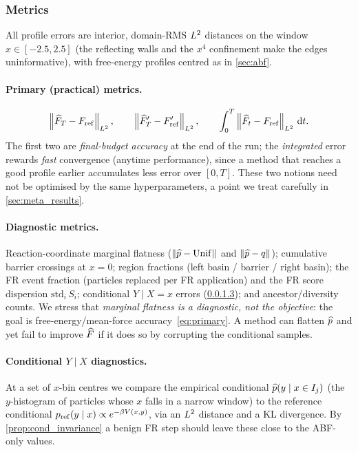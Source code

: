 \subsubsection{Metrics}
\label{sec:metrics}
All profile errors are interior, domain-RMS $L^2$ distances on the window
$x\in[-2.5,2.5]$ (the reflecting walls and the $x^4$ confinement make the edges
uninformative), with free-energy profiles centred as in \cref{sec:abf}.

\paragraph{Primary (practical) metrics.}
\begin{equation}
  \left\lVert \widehat{F}_T-F_{\mathrm{ref}} \right\rVert_{L^2},\qquad
  \left\lVert \widehat{F}'_T-F'_{\mathrm{ref}} \right\rVert_{L^2},\qquad
  \int_0^T \left\lVert \widehat{F}_t-F_{\mathrm{ref}} \right\rVert_{L^2}\,\mathrm{d} t.
  \label{eq:primary}
\end{equation}
The first two are \emph{final-budget accuracy} at the end of the run; the
\emph{integrated} error rewards \emph{fast} convergence (anytime performance),
since a method that reaches a good profile earlier accumulates less error over
$[0,T]$. These two notions need not be optimised by the same hyperparameters,
a point we treat carefully in \cref{sec:meta_results}.

\paragraph{Diagnostic metrics.}
Reaction-coordinate marginal flatness ($\left\lVert \widehat{p}-\mathrm{Unif} \right\rVert$ and
$\left\lVert \widehat{p}-q \right\rVert$); cumulative barrier crossings at $x=0$; region fractions
(left basin / barrier / right basin); the FR event fraction (particles replaced
per FR application) and the FR score dispersion $\mathrm{std}_i\,S_i$;
conditional $Y\mid X=x$ errors (\cref{sec:conditional}); and ancestor/diversity
counts. We stress that \emph{marginal flatness is a diagnostic, not the
objective}: the goal is free-energy/mean-force accuracy~\eqref{eq:primary}. A
method can flatten $\widehat{p}$ and yet fail to improve $\widehat{F}$ if it does so by
corrupting the conditional samples.

\paragraph{Conditional $Y\mid X$ diagnostics.}
\label{sec:conditional}
At a set of $x$-bin centres we compare the empirical conditional
$\widehat{p}(y\mid x\in I_j)$ (the $y$-histogram of particles whose $x$ falls in a
narrow window) to the reference conditional
$p_{\mathrm{ref}}(y\mid x)\propto e^{-\beta V(x,y)}$, via an $L^2$ distance and a KL
divergence. By \cref{prop:cond_invariance} a benign FR step should leave these
close to the ABF-only values.

